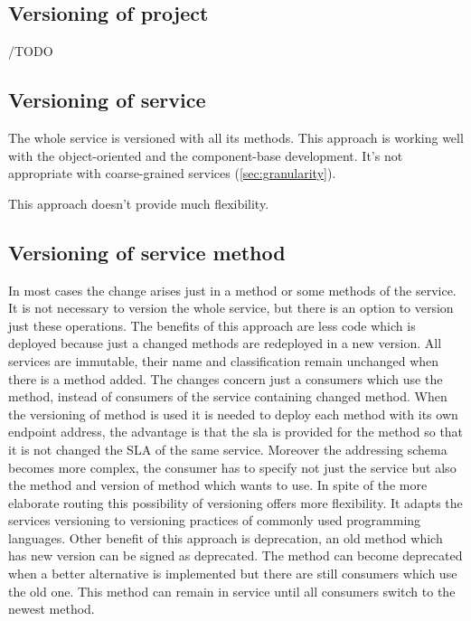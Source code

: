 \subsection{Versioning of project}
  /TODO 
\subsection{Versioning of service}
  The whole service is versioned with all its methods. This approach is working well with the object-oriented and the component-base development. It's not appropriate with coarse-grained services (\ref{sec:granularity}). \cite{website:versioning-in-soa} 
  
  This approach doesn't provide much flexibility.
  
\subsection{Versioning of service method}
  In most cases the change arises just in a method or some methods of the service. It is not necessary to version the whole service, but there is an option to version just these operations.
  The benefits of this approach are less code which is deployed because just a changed methods are redeployed in a new version. All services are immutable, their name and classification remain unchanged when there is a method added. The changes concern just a consumers which use the method, instead of consumers of the service containing changed method. 
  When the versioning of method is used it is needed to deploy each method with its own endpoint address, the advantage is that the \gls{sla} is provided for the method so that it is not changed the SLA of the same service.
  Moreover the addressing schema becomes more complex, the consumer has to specify not just the service but also the method and version of method which wants to use.
In spite of the more elaborate routing this possibility of versioning offers more flexibility. It adapts the services versioning to versioning practices of commonly used programming languages. 
Other benefit of this approach is deprecation, an old method which has new version can be signed as deprecated. The method can become deprecated when a better alternative is implemented but there are still consumers which use the old one. This method can remain in service until all consumers switch to the newest method.



